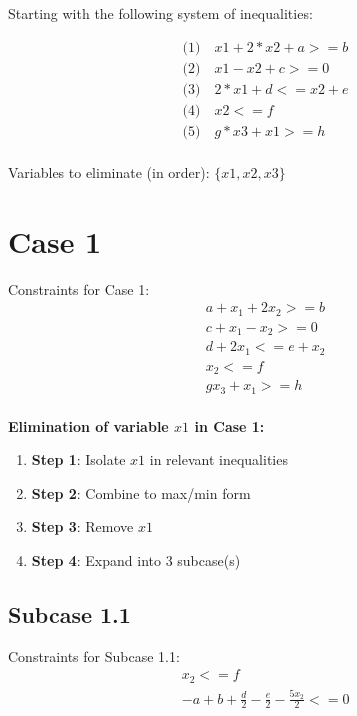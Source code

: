\documentclass{article}
\begin{document}
Starting with the following system of inequalities:

\begin{align}
& \text{(1)} \quad x1 + 2*x2 + a >= b \\
& \text{(2)} \quad x1 - x2 + c >= 0 \\
& \text{(3)} \quad 2*x1 + d <= x2 + e \\
& \text{(4)} \quad x2 <= f \\
& \text{(5)} \quad g*x3 + x1 >= h \\
\end{align}

Variables to eliminate (in order): $\{x1, x2, x3\}$

\section{Case 1}

Constraints for Case 1:
\begin{align}
& a + x_{1} + 2 x_{2} >= b \\
& c + x_{1} - x_{2} >= 0 \\
& d + 2 x_{1} <= e + x_{2} \\
& x_{2} <= f \\
& g x_{3} + x_{1} >= h \\
\end{align}

\textbf{Elimination of variable $x1$ in Case 1:}

\begin{enumerate}
\item \textbf{Step 1}: Isolate $x1$ in relevant inequalities
\item \textbf{Step 2}: Combine to max/min form
\item \textbf{Step 3}: Remove $x1$
\item \textbf{Step 4}: Expand into 3 subcase(s)
\end{enumerate}

\subsection{Subcase 1.1}

Constraints for Subcase 1.1:
\begin{align}
& x_{2} <= f \\
& - a + b + \frac{d}{2} - \frac{e}{2} - \frac{5 x_{2}}{2} <= 0 \\
\end{align}
\end{document}
